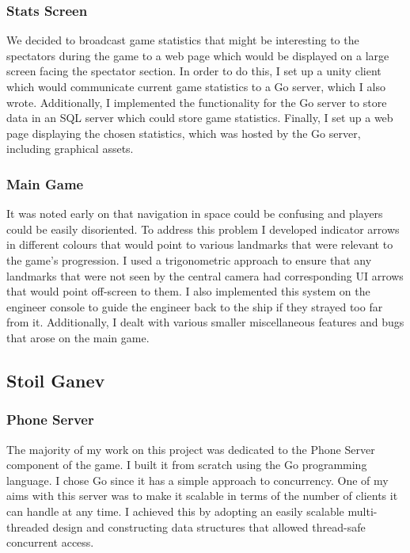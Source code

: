 \documentclass[a4paper,11pt]{article}
\begin{document}
\subsubsection{Stats Screen}

We decided to broadcast game statistics that might be interesting to the spectators during the game to a web page which would be displayed on a large screen facing the spectator section. In order to do this, I set up a unity client which would communicate current game statistics to a Go server, which I also wrote. Additionally, I implemented the functionality for the Go server to store data in an SQL server which could store game statistics. Finally, I set up a web page displaying the chosen statistics, which was hosted by the Go server, including graphical assets.

\subsubsection{Main Game}

It was noted early on that navigation in space could be confusing and players could be easily disoriented. To address this problem I developed indicator arrows in different colours that would point to various landmarks that were relevant to the game’s progression. I used a trigonometric approach to ensure that any landmarks that were not seen by the central camera had corresponding UI arrows that would point off-screen to them. I also implemented this system on the engineer console to guide the engineer back to the ship if they strayed too far from it. Additionally, I dealt with various smaller miscellaneous features and bugs that arose on the main game.

\clearpage

\subsection{Stoil Ganev}

\subsubsection{Phone Server}

The majority of my work on this project was dedicated to the Phone Server component of the game. I built it from scratch using the Go programming language. I chose Go since it has a simple approach to concurrency. One of my aims with this server was to make it scalable in terms of the number of clients it can handle at any time. I achieved this by adopting an easily scalable multi-threaded design and constructing data structures that allowed thread-safe concurrent access.
\end{document}
